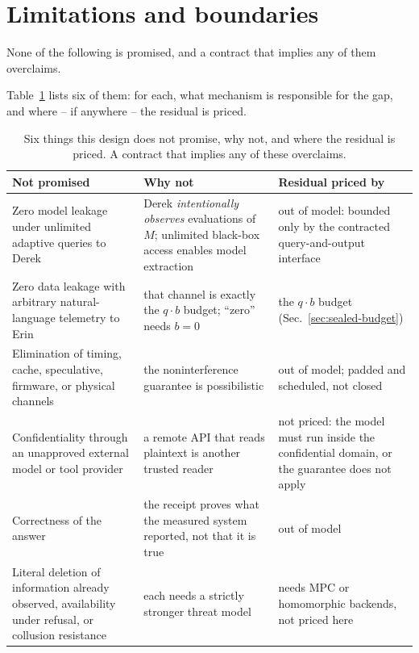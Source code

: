 \documentclass[11pt,a4paper]{article}
\theoremstyle{definition}
\begin{document}


\section{Limitations and boundaries}\label{sec:sealed-limitations}

None of the following is promised, and a contract that implies any of them
overclaims.

Table~\ref{tab:sealed-not-promised} lists six of them: for each, what
mechanism is responsible for the gap, and where -- if anywhere -- the residual
is priced.

\begin{table}[H]\centering\footnotesize
\caption{Six things this design does not promise, why not, and where the
residual is priced. A contract that implies any of these overclaims.}
\label{tab:sealed-not-promised}
\begin{tabularx}{\textwidth}{@{}>{\raggedright\arraybackslash}p{3.5cm} >{\raggedright\arraybackslash}X >{\raggedright\arraybackslash}p{3.3cm}@{}}
\toprule
Not promised & Why not & Residual priced by \\
\midrule
Zero model leakage under unlimited adaptive queries to Derek & Derek \emph{intentionally observes} evaluations of $M$; unlimited black-box access enables model extraction & out of model: bounded only by the contracted query-and-output interface \\
Zero data leakage with arbitrary natural-language telemetry to Erin & that channel is exactly the $q\cdot b$ budget; ``zero'' needs $b=0$ & the $q\cdot b$ budget (Sec.~\ref{sec:sealed-budget}) \\
Elimination of timing, cache, speculative, firmware, or physical channels & the noninterference guarantee is possibilistic & out of model; padded and scheduled, not closed \\
Confidentiality through an unapproved external model or tool provider & a remote API that reads plaintext is another trusted reader & not priced: the model must run inside the confidential domain, or the guarantee does not apply \\
Correctness of the answer & the receipt proves what the measured system reported, not that it is true & out of model \\
Literal deletion of information already observed, availability under refusal, or collusion resistance & each needs a strictly stronger threat model & needs MPC or homomorphic backends, not priced here \\
\bottomrule
\end{tabularx}
\end{table}
\end{document}
